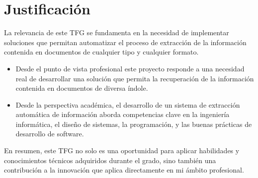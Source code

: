 \section{Justificación}

La relevancia de este TFG se fundamenta en la necesidad de implementar soluciones que permitan automatizar el proceso de
extracción de la información contenida en documentos de cualquier tipo y cualquier formato.

\begin{itemize}
    \item Desde el punto de vista profesional este proyecto responde a una necesidad real de desarrollar una solución
    que permita la recuperación de la información contenida en documentos de diversa índole.
    \item Desde la perspectiva académica, el desarrollo de un sistema de extracción automática de información aborda
    competencias clave en la ingeniería informática, el diseño de sistemas, la programación, y las buenas prácticas de
    desarrollo de software.
\end{itemize}

En resumen, este TFG no solo es una oportunidad para aplicar habilidades y conocimientos técnicos adquiridos durante el
grado, sino también una contribución a la innovación que aplica directamente en mi ámbito profesional.


